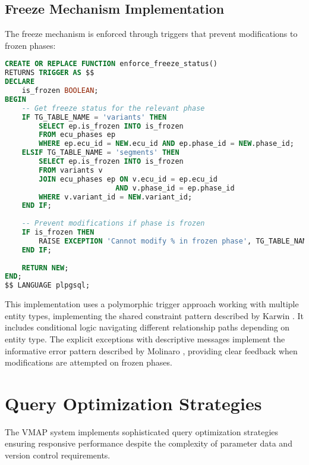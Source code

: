 \subsection{Freeze Mechanism Implementation}
\label{subsec:freeze-mechanism-implementation}

The freeze mechanism is enforced through triggers that prevent modifications to frozen phases:

\begin{lstlisting}[language=SQL, caption={Freeze Status Enforcement Implementation}, label={lst:freeze-enforcement}]
CREATE OR REPLACE FUNCTION enforce_freeze_status()
RETURNS TRIGGER AS $$
DECLARE
    is_frozen BOOLEAN;
BEGIN
    -- Get freeze status for the relevant phase
    IF TG_TABLE_NAME = 'variants' THEN
        SELECT ep.is_frozen INTO is_frozen
        FROM ecu_phases ep
        WHERE ep.ecu_id = NEW.ecu_id AND ep.phase_id = NEW.phase_id;
    ELSIF TG_TABLE_NAME = 'segments' THEN
        SELECT ep.is_frozen INTO is_frozen
        FROM variants v
        JOIN ecu_phases ep ON v.ecu_id = ep.ecu_id 
                          AND v.phase_id = ep.phase_id
        WHERE v.variant_id = NEW.variant_id;
    END IF;
    
    -- Prevent modifications if phase is frozen
    IF is_frozen THEN
        RAISE EXCEPTION 'Cannot modify % in frozen phase', TG_TABLE_NAME;
    END IF;
    
    RETURN NEW;
END;
$$ LANGUAGE plpgsql;
\end{lstlisting}

This implementation uses a polymorphic trigger approach working with multiple entity types, implementing the shared constraint pattern described by Karwin \cite{karwin2010sql}. It includes conditional logic navigating different relationship paths depending on entity type. The explicit exceptions with descriptive messages implement the informative error pattern described by Molinaro \cite{molinaro2005sql}, providing clear feedback when modifications are attempted on frozen phases.

\section{Query Optimization Strategies}
\label{sec:query-optimization-strategies}

The VMAP system implements sophisticated query optimization strategies ensuring responsive performance despite the complexity of parameter data and version control requirements.

